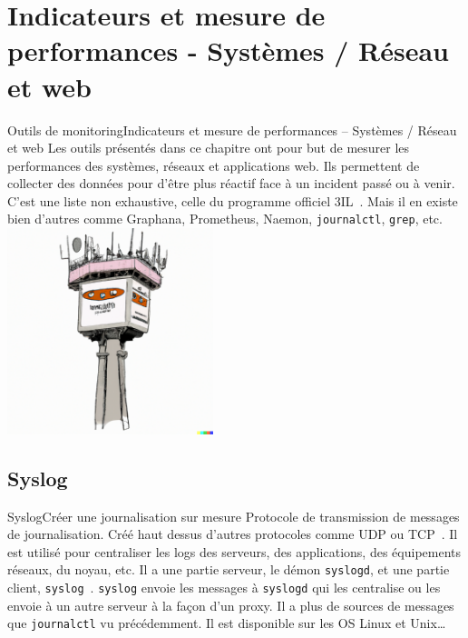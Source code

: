 \documentclass{beamer}
\begin{document}
    \section{Indicateurs et mesure de performances - Systèmes / Réseau et web}\label{sec:indicateurs-et-mesure-de-performances--systemes-/-reseau-et-web}

    \begin{frame}{Outils de monitoring}{Indicateurs et mesure de performances – Systèmes / Réseau et web}
        Les outils présentés dans ce chapitre ont pour but de mesurer les performances des systèmes, réseaux et applications web.
        Ils permettent de collecter des données pour d'être plus réactif face à un incident passé ou à venir.
        \bigbreak
        C'est une liste non exhaustive, celle du programme officiel 3IL~.
        Mais il en existe bien d'autres comme Graphana, Prometheus, Naemon, \lstinline{journalctl}, \lstinline{grep}, etc.
        \bigbreak
        \centering
        \includegraphics[width=6cm]{image/control-tower}
    \end{frame}

    \subsection{Syslog}\label{subsec:syslog}

    \begin{frame}{Syslog}{Créer une journalisation sur mesure}
        Protocole de transmission de messages de journalisation.
        Créé haut dessus d'autres protocoles comme UDP ou TCP~.
        \bigbreak
        Il est utilisé pour centraliser les logs des serveurs, des applications, des équipements réseaux, du noyau, etc.
        \bigbreak
        Il a une partie serveur, le démon \lstinline{syslogd}, et une partie client, \lstinline{syslog}~.
        \lstinline{syslog} envoie les messages à \lstinline{syslogd} qui les centralise ou les envoie à un autre serveur à la façon d'un proxy.
        \bigbreak
        Il a plus de sources de messages que \lstinline{journalctl} vu précédemment.
        \bigbreak
        Il est disponible sur les OS Linux et Unix\ldots
    \end{frame}
\end{document}
